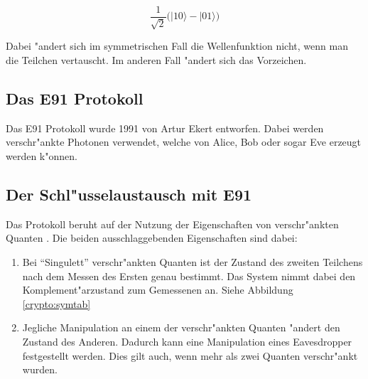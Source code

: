   \[\frac{1}{\sqrt{2}}\big(|10\rangle-|01\rangle\big)\]

  Dabei "andert sich im symmetrischen Fall die Wellenfunktion nicht, wenn man die Teilchen vertauscht. Im anderen Fall "andert sich das Vorzeichen.

  \subsection{Das E91 Protokoll}
  Das E91 Protokoll wurde 1991 von Artur Ekert entworfen.
  Dabei werden verschr"ankte Photonen verwendet, welche von Alice, Bob oder sogar Eve erzeugt werden k"onnen.

  \subsection{Der Schl"usselaustausch mit E91}
  Das Protokoll beruht auf der Nutzung der Eigenschaften von verschr"ankten Quanten \cite{qc:verschraenkung}.
  Die beiden ausschlaggebenden Eigenschaften sind dabei:

  \begin{enumerate}
      \item Bei ``Singulett'' verschr"ankten Quanten ist der Zustand des zweiten Teilchens nach dem Messen des Ersten genau bestimmt.
        Das System nimmt dabei den Komplement"arzustand zum Gemessenen an.
        Siehe Abbildung \ref{crypto:symtab}
      \item Jegliche Manipulation an einem der verschr"ankten Quanten "andert den Zustand des Anderen.
        Dadurch kann eine Manipulation eines Eavesdropper festgestellt werden.
        Dies gilt auch, wenn mehr als zwei Quanten verschr"ankt wurden.
  \end{enumerate}

